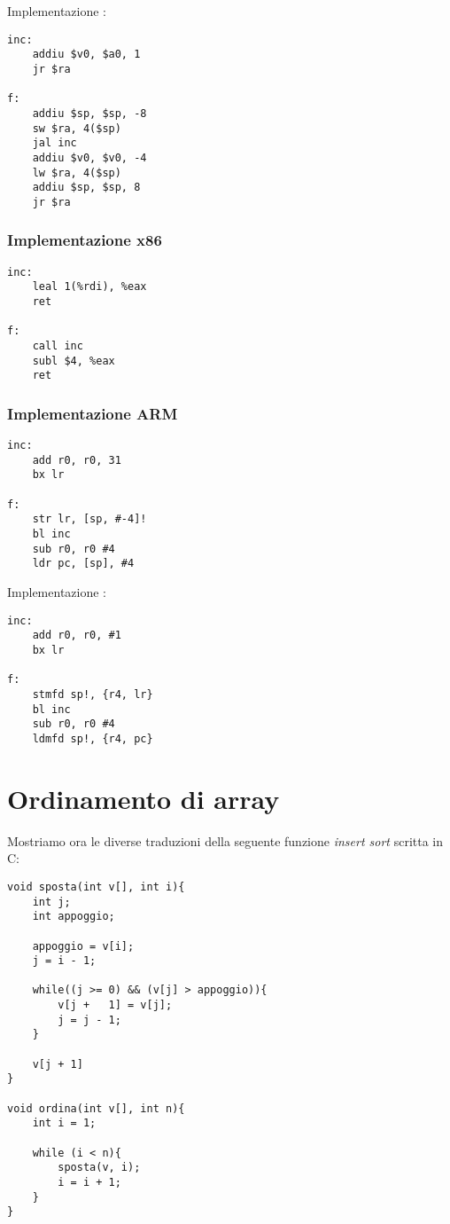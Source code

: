 \documentclass[class=book, crop=false, oneside]{standalone}
\begin{document}
Implementazione :
\begin{verbatim}
inc:
	addiu $v0, $a0, 1
	jr $ra

f:
	addiu $sp, $sp, -8
	sw $ra, 4($sp)
	jal inc
	addiu $v0, $v0, -4
	lw $ra, 4($sp)
	addiu $sp, $sp, 8
	jr $ra
\end{verbatim}

\subsubsection{Implementazione x86}
\begin{verbatim}
inc:
	leal 1(%rdi), %eax
	ret

f:
	call inc
	subl $4, %eax
	ret
\end{verbatim}

\subsubsection{Implementazione ARM}
\begin{verbatim}
inc:
	add r0, r0, 31
	bx lr

f:
	str lr, [sp, #-4]!
	bl inc
	sub r0, r0 #4
	ldr pc, [sp], #4
\end{verbatim}

Implementazione :
\begin{verbatim}
inc:
	add r0, r0, #1
	bx lr

f:
	stmfd sp!, {r4, lr}
	bl inc
	sub r0, r0 #4
	ldmfd sp!, {r4, pc}
\end{verbatim}

\section{Ordinamento di array}
Mostriamo ora le diverse traduzioni della seguente funzione \emph{insert sort} scritta in C:

\begin{verbatim}
void sposta(int v[], int i){
	int j;
	int appoggio;

	appoggio = v[i];
	j = i - 1;

	while((j >= 0) && (v[j] > appoggio)){
		v[j +	1] = v[j];
		j = j - 1;
	}

	v[j + 1]
}

void ordina(int v[], int n){
	int i = 1;

	while (i < n){
		sposta(v, i);
		i = i + 1;
	}
}
\end{verbatim}
\end{document}
